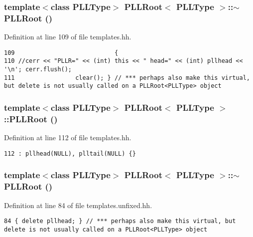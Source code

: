 \subsubsection{\setlength{\rightskip}{0pt plus 5cm}template$<$class PLLType$>$ PLLRoot$<$ {\bf PLLType} $>$::$\sim$PLLRoot ()\hspace{0.3cm}{\tt  [inline]}}\label{classPLLRoot_a34}




Definition at line 109 of file templates.hh.



\footnotesize\begin{verbatim}109                            {
110 //cerr << "PLLR=" << (int) this << " head=" << (int) pllhead << '\n'; cerr.flush();
111                 clear(); } // *** perhaps also make this virtual, but delete is not usually called on a PLLRoot<PLLType> object
\end{verbatim}\normalsize 
{}
\subsubsection{\setlength{\rightskip}{0pt plus 5cm}template$<$class PLLType$>$ PLLRoot$<$ {\bf PLLType} $>$::PLLRoot ()\hspace{0.3cm}{\tt  [inline]}}\label{classPLLRoot_a35}




Definition at line 112 of file templates.hh.



\footnotesize\begin{verbatim}112 : pllhead(NULL), plltail(NULL) {}
\end{verbatim}\normalsize 
{}
\subsubsection{\setlength{\rightskip}{0pt plus 5cm}template$<$class PLLType$>$ PLLRoot$<$ {\bf PLLType} $>$::$\sim$PLLRoot ()\hspace{0.3cm}{\tt  [inline]}}\label{classPLLRoot_a51}




Definition at line 84 of file templates.unfixed.hh.



\footnotesize\begin{verbatim}84 { delete pllhead; } // *** perhaps also make this virtual, but delete is not usually called on a PLLRoot<PLLType> object
\end{verbatim}\normalsize 
{}
